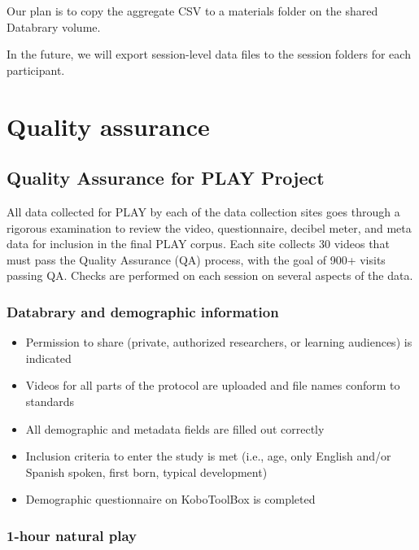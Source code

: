 \documentclass[
  12pt,
]{book}
\providecommand{\tightlist}{%
  \setlength{\itemsep}{0pt}\setlength{\parskip}{0pt}}
\begin{document}
Our plan is to copy the aggregate CSV to a materials folder on the shared Databrary volume.

In the future, we will export session-level data files to the session folders for each participant.

\hypertarget{quality-assurance}{%
\chapter{Quality assurance}\label{quality-assurance}}

\hypertarget{quality-assurance-for-play-project}{%
\section{Quality Assurance for PLAY Project}\label{quality-assurance-for-play-project}}

All data collected for PLAY by each of the data collection sites goes through a rigorous examination to review the video, questionnaire, decibel meter, and meta data for inclusion in the final PLAY corpus. Each site collects 30 videos that must pass the Quality Assurance (QA) process, with the goal of 900+ visits passing QA. Checks are performed on each session on several aspects of the data.

\hypertarget{databrary-and-demographic-information}{%
\subsection{Databrary and demographic information}\label{databrary-and-demographic-information}}

\begin{itemize}
\tightlist
\item
  Permission to share (private, authorized researchers, or learning audiences) is indicated
\item
  Videos for all parts of the protocol are uploaded and file names conform to standards
\item
  All demographic and metadata fields are filled out correctly
\item
  Inclusion criteria to enter the study is met (i.e., age, only English and/or Spanish spoken, first born, typical development)
\item
  Demographic questionnaire on KoboToolBox is completed
\end{itemize}

\hypertarget{hour-natural-play}{%
\subsection{1-hour natural play}\label{hour-natural-play}}
\end{document}
